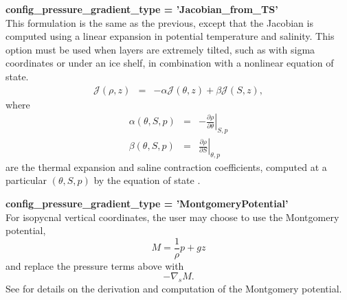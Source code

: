 {\bf \large config\_pressure\_gradient\_type = 'Jacobian\_from\_TS'}\\
This formulation is the same as the previous, except that the Jacobian is computed using a linear expansion in potential temperature and salinity.  This option must be used when layers are extremely tilted, such as with sigma coordinates or under an ice shelf, in combination with a nonlinear equation of state.
\begin{eqnarray}
 {\mathcal J}(\rho,z) &=& -\alpha  {\mathcal J}(\theta,z) + \beta  {\mathcal J}(S,z), 
\end{eqnarray}
where
\begin{eqnarray}
\alpha\left( \theta, S, p\right) &=&  -\left. \frac{\partial \rho}{\partial \theta} \right|_{S,p} \\
\beta\left( \theta, S, p\right) &=&  \left. \frac{\partial \rho}{\partial S} \right|_{\theta,p} 
\end{eqnarray}
are the thermal expansion and saline contraction coefficients, computed at a particular  $\left(\theta, S, p\right)$ by the equation of state \citep[eqn 7.16]{Shchepetkin_McWilliams03jgr}.

{\bf \large config\_pressure\_gradient\_type = 'MontgomeryPotential'}\\
For isopycnal vertical coordinates, the user may choose to use the Montgomery potential,
\begin{equation}
\label{ocean:\mode_Montgomery Potential}
M = \frac{1}{\rho}p+gz
\end{equation}
and replace the pressure terms above with
\begin{equation}
- \nabla_s M.
\end{equation}
See \citet[section 2.1]{Higdon05jcp} for details on the derivation and computation of the Montgomery potential.

